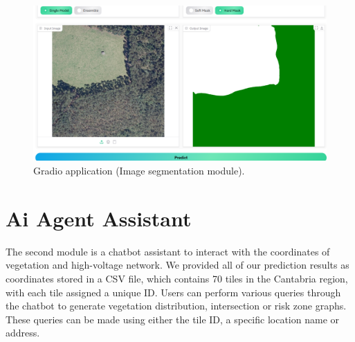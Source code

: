 \begin{figure}[H]
 \centering
 \includegraphics[scale=0.55]{IMAGENES/Gradio_app_segmentation2.png}
 \captionsetup{font=large}
 \caption {Gradio application (Image segmentation module).}
\end{figure}

\section{Ai Agent Assistant}
The second module is a chatbot assistant to interact with the coordinates of vegetation and high-voltage network. We provided all of our prediction results as coordinates stored in a CSV file, which contains 70 tiles in the Cantabria region, with each tile assigned a unique ID. Users can perform various queries through the chatbot to generate vegetation distribution, intersection or risk zone graphs. These queries can be made using either the tile ID, a specific location name or address.

